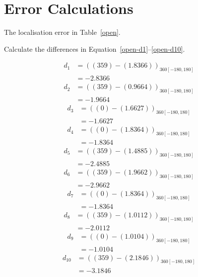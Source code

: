 \documentclass[twocolumn]{article}
\begin{document}
\clearpage

\section{Error Calculations}

The localisation error in Table~\ref{open}.\cite{alexneil4}

Calculate the differences in Equation~\ref{open-d1}--\ref{open-d10}.

\begin{align}
d_{1} &= ((359) - (1.8366))_{360[-180,180]} \nonumber\\
 &= -2.8366 \label{open-d1}
\end{align}
\begin{align}
d_{2} &= ((359) - (0.9664))_{360[-180,180]} \nonumber\\
 &= -1.9664 \label{open-d2}
\end{align}
\begin{align}
d_{3} &= ((0) - (1.6627))_{360[-180,180]} \nonumber\\
 &= -1.6627 \label{open-d3}
\end{align}
\begin{align}
d_{4} &= ((0) - (1.8364))_{360[-180,180]} \nonumber\\
 &= -1.8364 \label{open-d4}
\end{align}
\begin{align}
d_{5} &= ((359) - (1.4885))_{360[-180,180]} \nonumber\\
 &= -2.4885 \label{open-d5}
\end{align}
\begin{align}
d_{6} &= ((359) - (1.9662))_{360[-180,180]} \nonumber\\
 &= -2.9662 \label{open-d6}
\end{align}
\begin{align}
d_{7} &= ((0) - (1.8364))_{360[-180,180]} \nonumber\\
 &= -1.8364 \label{open-d7}
\end{align}
\begin{align}
d_{8} &= ((359) - (1.0112))_{360[-180,180]} \nonumber\\
 &= -2.0112 \label{open-d8}
\end{align}
\begin{align}
d_{9} &= ((0) - (1.0104))_{360[-180,180]} \nonumber\\
 &= -1.0104 \label{open-d9}
\end{align}
\begin{align}
d_{10} &= ((359) - (2.1846))_{360[-180,180]} \nonumber\\
 &= -3.1846 \label{open-d10}
\end{align}
\end{document}

